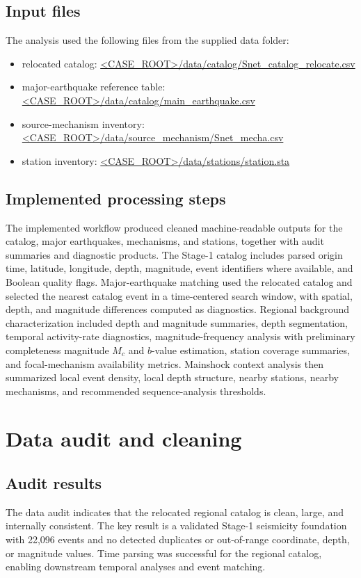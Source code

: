 \documentclass[11pt]{article}
\begin{document}
\subsection{Input files}
The analysis used the following files from the supplied data folder:
\begin{itemize}[leftmargin=*]
    \item relocated catalog: \url{<CASE_ROOT>/data/catalog/Snet_catalog_relocate.csv}
    \item major-earthquake reference table: \url{<CASE_ROOT>/data/catalog/main_earthquake.csv}
    \item source-mechanism inventory: \url{<CASE_ROOT>/data/source_mechanism/Snet_mecha.csv}
    \item station inventory: \url{<CASE_ROOT>/data/stations/station.sta}
\end{itemize}

\subsection{Implemented processing steps}
The implemented workflow produced cleaned machine-readable outputs for the catalog, major earthquakes, mechanisms, and stations, together with audit summaries and diagnostic products. The Stage-1 catalog includes parsed origin time, latitude, longitude, depth, magnitude, event identifiers where available, and Boolean quality flags. Major-earthquake matching used the relocated catalog and selected the nearest catalog event in a time-centered search window, with spatial, depth, and magnitude differences computed as diagnostics. Regional background characterization included depth and magnitude summaries, depth segmentation, temporal activity-rate diagnostics, magnitude-frequency analysis with preliminary completeness magnitude $M_c$ and $b$-value estimation, station coverage summaries, and focal-mechanism availability metrics. Mainshock context analysis then summarized local event density, local depth structure, nearby stations, nearby mechanisms, and recommended sequence-analysis thresholds.

\section{Data audit and cleaning}
\subsection{Audit results}
The data audit indicates that the relocated regional catalog is clean, large, and internally consistent. The key result is a validated Stage-1 seismicity foundation with 22{,}096 events and no detected duplicates or out-of-range coordinate, depth, or magnitude values. Time parsing was successful for the regional catalog, enabling downstream temporal analyses and event matching.
\end{document}
